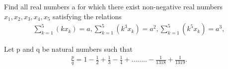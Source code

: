 \item Find all real numbers a for which there exist non-negative real numbers $x_1, x_2, x_3, x_4, x_5$ satisfying the relations
\begin{align*}
\sum_{k=1}^{5}(kx_k) = a, \sum_{k=1}^{5}(k^3x_k) = a^2, \sum_{k=1}^{5}(k^5x_k) = a^3,
\end{align*}

\item Let p and q be natural numbers such that
\begin{align*}
\frac{p}{q} = 1 - \frac{1}{2} + \frac{1}{3} - \frac{1}{4} +........-\frac{1}{1318} + \frac{1}{1319}.
\end{align*}




